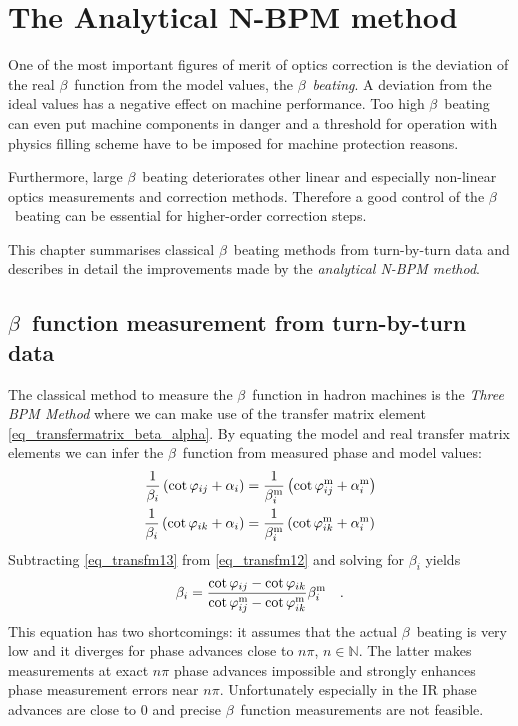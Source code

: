 \chapter{The Analytical N-BPM method}

\begin{chapterinfo}
One of the most important figures of merit of optics correction is the deviation of the real $\beta$~function
from the model values,
the $\beta$~\emph{beating}. A deviation from the ideal values has a negative effect on machine performance.
Too high $\beta$~beating can even put machine components in danger and a threshold for operation with
physics filling scheme have to be imposed for machine protection reasons.

Furthermore, large $\beta$~beating deteriorates other linear and especially non-linear optics measurements
and correction methods. Therefore a good control of the $\beta$~beating can be essential for higher-order
correction steps.

This chapter summarises classical $\beta$~beating methods from turn-by-turn data and describes in
detail the improvements made by the \emph{analytical N-BPM method}.
\end{chapterinfo}

\section{$\beta$~function measurement from turn-by-turn data}

The classical method to measure the $\beta$~function in hadron machines is the \emph{Three BPM Method}
where we can make use of the transfer matrix element \eqref{eq_transfermatrix_beta_alpha}. By equating
the model and real transfer matrix elements we can infer the $\beta$~function from measured phase
and model values:
\begin{align}
    \frac{1}{\beta_i} \left( \cot\varphi_{ij} + \alpha_i\right)
    &= \frac{1}{\beta^\text{m}_i} \left(\cot\varphi_{ij}^\text{m} + \alpha_i^\text{m}\right)
    \label{eq_transfm12}\\
    \frac{1}{\beta_i} \left( \cot\varphi_{ik} + \alpha_i\right)
    &= \frac{1}{\beta^\text{m}_i} \left(\cot\varphi_{ik}^\text{m} + \alpha_i^\text{m}\right)
    \label{eq_transfm13}
\end{align}
Subtracting \eqref{eq_transfm13} from \eqref{eq_transfm12} and solving for $\beta_i$ yields
\begin{equation}
    \beta_i = \frac{\cot\varphi_{ij} - \cot{\varphi_{ik}}}{\cot\varphi_{ij}^\text{m} - \cot{\varphi_{ik}^\text{m}}}\beta_i^\text{m}
    \label{eq_three_bpm}
    \quad .
\end{equation}
This equation has two shortcomings: it assumes that the actual $\beta$~beating is very low and it
diverges for phase advances close to $n\pi$, $n \in \mathbb{N}$. The latter makes measurements at
exact $n\pi$ phase advances impossible and strongly enhances phase measurement errors near $n\pi$.
Unfortunately especially in the IR phase advances are close to 0 and precise $\beta$~function measurements
are not feasible.


